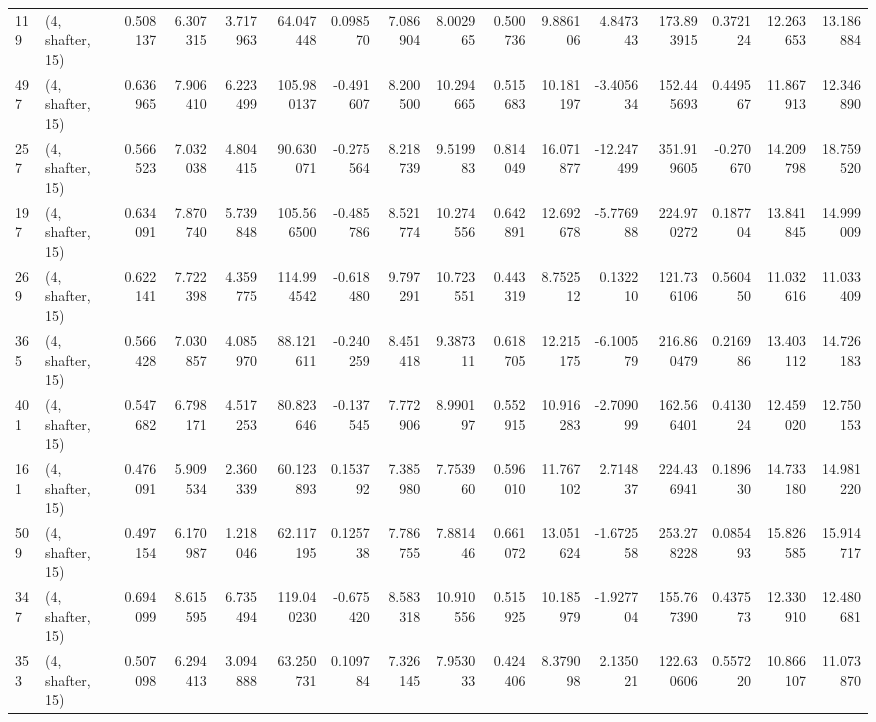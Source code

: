 \begin{tabular}{llrrrrrrrrrrrrrr}
119 &  (4, shafter, 15) &   0.508137 &   6.307315 &   3.717963 &    64.047448 &   0.098570 &   7.086904 &   8.002965 &  0.500736 &   9.886106 &   4.847343 &   173.893915 &  0.372124 &  12.263653 &  13.186884 \\
497 &  (4, shafter, 15) &   0.636965 &   7.906410 &   6.223499 &   105.980137 &  -0.491607 &   8.200500 &  10.294665 &  0.515683 &  10.181197 &  -3.405634 &   152.445693 &  0.449567 &  11.867913 &  12.346890 \\
257 &  (4, shafter, 15) &   0.566523 &   7.032038 &   4.804415 &    90.630071 &  -0.275564 &   8.218739 &   9.519983 &  0.814049 &  16.071877 & -12.247499 &   351.919605 & -0.270670 &  14.209798 &  18.759520 \\
197 &  (4, shafter, 15) &   0.634091 &   7.870740 &   5.739848 &   105.566500 &  -0.485786 &   8.521774 &  10.274556 &  0.642891 &  12.692678 &  -5.776988 &   224.970272 &  0.187704 &  13.841845 &  14.999009 \\
269 &  (4, shafter, 15) &   0.622141 &   7.722398 &   4.359775 &   114.994542 &  -0.618480 &   9.797291 &  10.723551 &  0.443319 &   8.752512 &   0.132210 &   121.736106 &  0.560450 &  11.032616 &  11.033409 \\
365 &  (4, shafter, 15) &   0.566428 &   7.030857 &   4.085970 &    88.121611 &  -0.240259 &   8.451418 &   9.387311 &  0.618705 &  12.215175 &  -6.100579 &   216.860479 &  0.216986 &  13.403112 &  14.726183 \\
401 &  (4, shafter, 15) &   0.547682 &   6.798171 &   4.517253 &    80.823646 &  -0.137545 &   7.772906 &   8.990197 &  0.552915 &  10.916283 &  -2.709099 &   162.566401 &  0.413024 &  12.459020 &  12.750153 \\
161 &  (4, shafter, 15) &   0.476091 &   5.909534 &   2.360339 &    60.123893 &   0.153792 &   7.385980 &   7.753960 &  0.596010 &  11.767102 &   2.714837 &   224.436941 &  0.189630 &  14.733180 &  14.981220 \\
509 &  (4, shafter, 15) &   0.497154 &   6.170987 &   1.218046 &    62.117195 &   0.125738 &   7.786755 &   7.881446 &  0.661072 &  13.051624 &  -1.672558 &   253.278228 &  0.085493 &  15.826585 &  15.914717 \\
347 &  (4, shafter, 15) &   0.694099 &   8.615595 &   6.735494 &   119.040230 &  -0.675420 &   8.583318 &  10.910556 &  0.515925 &  10.185979 &  -1.927704 &   155.767390 &  0.437573 &  12.330910 &  12.480681 \\
353 &  (4, shafter, 15) &   0.507098 &   6.294413 &   3.094888 &    63.250731 &   0.109784 &   7.326145 &   7.953033 &  0.424406 &   8.379098 &   2.135021 &   122.630606 &  0.557220 &  10.866107 &  11.073870 \\

\end{tabular}
